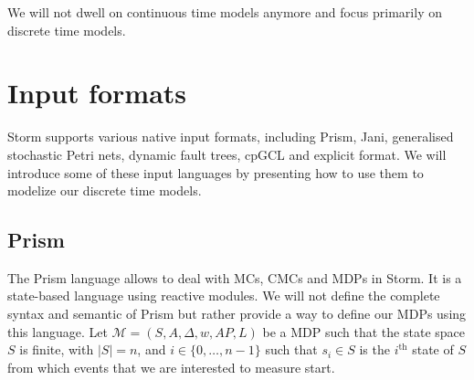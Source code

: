 We will not dwell on continuous time models anymore and focus primarily on discrete time models.

\section{Input formats}
Storm supports various native input formats, including Prism, Jani, generalised stochastic Petri nets, dynamic fault trees, cpGCL and explicit format.
We will introduce some of these input languages by presenting how to use them to modelize our
discrete time models.
\subsection{Prism}
The Prism language \cite{prismsynt} allows to deal with MCs, CMCs and MDPs in Storm.
It is a state-based language using reactive modules.
We will not define the complete syntax and semantic of Prism but rather provide a way to
define our MDPs using this language. Let $\mathcal{M} = (S, A, \Delta, w, AP, L)$ be a MDP such that the state space
$S$ is finite, with $|S| = n$, and $i \in \{0, \dots, n-1\}$ such that $s_i \in S$ is the $i^{\text{th}}$ state of $S$ from which events that we are
interested to measure start. \\

